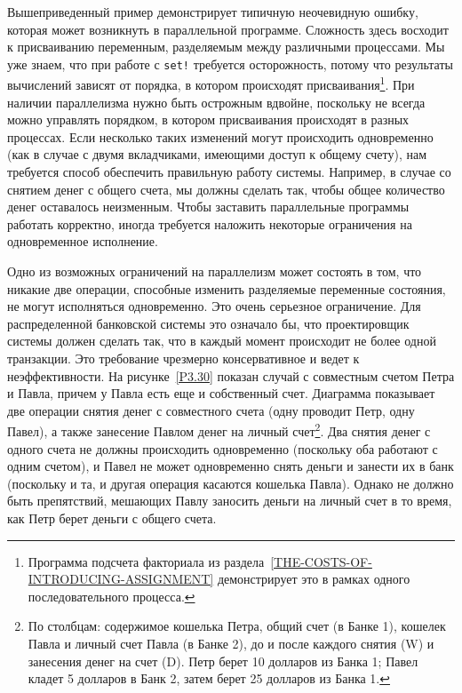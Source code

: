 Вышеприведенный пример демонстрирует типичную неочевидную
ошибку, которая может возникнуть в параллельной программе.  Сложность здесь
восходит к присваиванию переменным, разделяемым между различными
процессами.  Мы уже знаем, что при работе с
{\tt set!} требуется осторожность, потому что результаты вычислений зависят от
порядка, в котором происходят присваивания\footnote{Программа подсчета факториала из
раздела~\ref{THE-COSTS-OF-INTRODUCING-ASSIGNMENT} демонстрирует
это в рамках одного последовательного процесса.}.
При наличии параллелизма нужно быть острожным вдвойне,
поскольку не всегда можно управлять порядком, в
котором присваивания происходят в разных процессах.  Если несколько
таких изменений могут происходить одновременно (как в случае с двумя
вкладчиками, имеющими доступ к общему счету), нам требуется способ
обеспечить правильную работу системы.  Например, в случае со снятием
денег с общего счета, мы должны сделать так, чтобы общее количество
денег оставалось неизменным.  Чтобы заставить параллельные программы
работать корректно, иногда требуется наложить некоторые ограничения
на одновременное исполнение.

Одно из возможных ограничений на параллелизм может
состоять в том, что никакие две операции, способные изменить
разделяемые переменные состояния, не могут исполняться одновременно.
Это очень серьезное ограничение.  Для распределенной банковской
системы это означало бы, что проектировщик системы должен сделать
так, что в каждый момент происходит не более одной транзакции.  Это
требование чрезмерно консервативное и ведет к неэффективности.  На
рисунке~\ref{P3.30} показан случай с совместным счетом
Петра и Павла, причем у Павла есть еще и собственный счет.  Диаграмма
показывает две операции снятия денег с совместного счета (одну
проводит Петр, одну Павел), а также занесение Павлом денег на личный
счет\footnote{По столбцам: содержимое кошелька Петра, общий
счет (в Банке 1), кошелек Павла и ли\-чный счет Павла (в Банке 2), до и
после каждого снятия (W) и занесения денег на счет (D).  Петр берет 10
долларов из Банка 1; Павел кладет 5 долларов в Банк 2, затем берет 25
долларов из Банка 1.
}.
Два снятия денег с одного счета не должны происходить одновременно
(поскольку оба работают с одним счетом), и Павел не может одновременно снять деньги и
занести их в банк (поскольку и та, и другая операция
касаются кошелька Павла).  Однако не должно быть
препятствий, мешающих Павлу заносить деньги на личный счет в то время, как
Петр берет деньги с общего счета.

